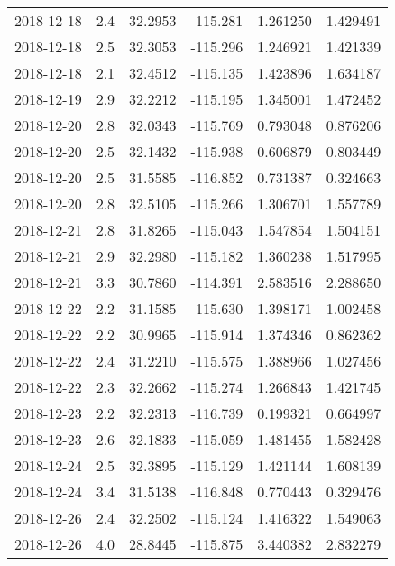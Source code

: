 \begin{tabular}{lrrrrr}
2018-12-18 &       2.4 &  32.2953 &  -115.281 &         1.261250 &         1.429491 \\
2018-12-18 &       2.5 &  32.3053 &  -115.296 &         1.246921 &         1.421339 \\
2018-12-18 &       2.1 &  32.4512 &  -115.135 &         1.423896 &         1.634187 \\
2018-12-19 &       2.9 &  32.2212 &  -115.195 &         1.345001 &         1.472452 \\
2018-12-20 &       2.8 &  32.0343 &  -115.769 &         0.793048 &         0.876206 \\
2018-12-20 &       2.5 &  32.1432 &  -115.938 &         0.606879 &         0.803449 \\
2018-12-20 &       2.5 &  31.5585 &  -116.852 &         0.731387 &         0.324663 \\
2018-12-20 &       2.8 &  32.5105 &  -115.266 &         1.306701 &         1.557789 \\
2018-12-21 &       2.8 &  31.8265 &  -115.043 &         1.547854 &         1.504151 \\
2018-12-21 &       2.9 &  32.2980 &  -115.182 &         1.360238 &         1.517995 \\
2018-12-21 &       3.3 &  30.7860 &  -114.391 &         2.583516 &         2.288650 \\
2018-12-22 &       2.2 &  31.1585 &  -115.630 &         1.398171 &         1.002458 \\
2018-12-22 &       2.2 &  30.9965 &  -115.914 &         1.374346 &         0.862362 \\
2018-12-22 &       2.4 &  31.2210 &  -115.575 &         1.388966 &         1.027456 \\
2018-12-22 &       2.3 &  32.2662 &  -115.274 &         1.266843 &         1.421745 \\
2018-12-23 &       2.2 &  32.2313 &  -116.739 &         0.199321 &         0.664997 \\
2018-12-23 &       2.6 &  32.1833 &  -115.059 &         1.481455 &         1.582428 \\
2018-12-24 &       2.5 &  32.3895 &  -115.129 &         1.421144 &         1.608139 \\
2018-12-24 &       3.4 &  31.5138 &  -116.848 &         0.770443 &         0.329476 \\
2018-12-26 &       2.4 &  32.2502 &  -115.124 &         1.416322 &         1.549063 \\
2018-12-26 &       4.0 &  28.8445 &  -115.875 &         3.440382 &         2.832279 \\

\end{tabular}
